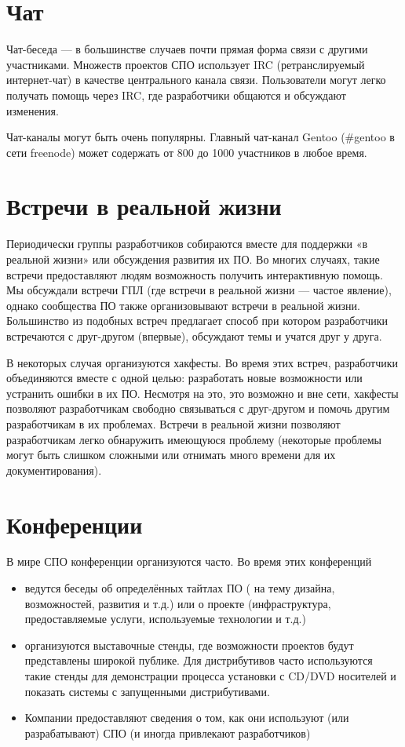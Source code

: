 \documentclass[12pt]{book}
\begin{document}
\section{Чат}

Чат-беседа — в большинстве случаев почти прямая форма связи с другими участниками. Множеств проектов СПО использует IRC (ретранслируемый интернет-чат) в качестве центрального канала связи. Пользователи могут легко получать помощь через IRC, где разработчики общаются и обсуждают изменения.

Чат-каналы могут быть очень популярны. Главный чат-канал Gentoo (\#gentoo в сети freenode) может содержать от 800 до 1000 участников в любое время.

\section{Встречи в реальной жизни}

Периодически группы разработчиков собираются вместе для поддержки «в реальной жизни» или обсуждения развития их ПО. Во многих случаях, такие встречи предоставляют людям возможность получить интерактивную помощь. Мы обсуждали встречи ГПЛ (где встречи в реальной жизни — частое явление), однако сообщества ПО также организовывают встречи в реальной жизни. Большинство из подобных встреч предлагает способ при котором разработчики встречаются с друг-другом (впервые), обсуждают темы и учатся друг у друга.

В некоторых случая организуются хакфесты. Во время этих встреч, разработчики объединяются вместе с одной целью: разработать новые возможности или устранить ошибки в их ПО. Несмотря на это, это возможно и вне сети, хакфесты позволяют разработчикам свободно связываться с друг-другом и помочь другим разработчикам в их проблемах. Встречи в реальной жизни позволяют разработчикам легко обнаружить имеющуюся проблему (некоторые проблемы могут быть слишком сложными или отнимать много времени для их документирования).

\section{Конференции}

В мире СПО конференции организуются часто. Во время этих конференций

\begin{itemize}
	\item ведутся беседы об определённых тайтлах ПО ( на тему дизайна, возможностей, развития и т.д.) или о проекте (инфраструктура, предоставляемые услуги, используемые технологии и т.д.)
	\item организуются выставочные стенды, где возможности проектов будут представлены широкой публике. Для дистрибутивов часто используются такие стенды для демонстрации процесса установки с CD/DVD носителей и показать системы с запущенными дистрибутивами.
	\item Компании предоставляют сведения о том, как они используют (или разрабатывают) СПО (и иногда привлекают разработчиков)
\end{itemize}
\end{document}
